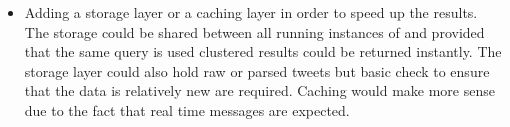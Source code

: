 \begin{itemize}
	\item Adding a storage layer or a caching layer in order to speed up the results. The storage could be shared between all running instances of {\project}  and provided that the same query is used clustered results could be returned instantly. The storage layer could also hold raw or parsed tweets but basic check to ensure that the data is relatively new are required. Caching would make more sense due to the fact that real time messages are expected.
\end{itemize}